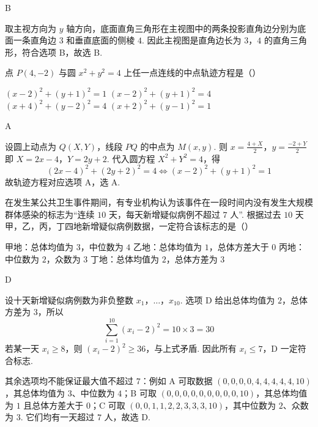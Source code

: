 \begin{answer}
B
\end{answer}

\begin{solution}
取主视方向为 \(y\) 轴方向，底面直角三角形在主视图中的两条投影直角边分别为底面一条直角边 \(3\) 和垂直底面的侧棱 \(4\). 因此主视图是直角边长为 \(3\)，\(4\) 的直角三角形，符合选项 B，故选 B.
\end{solution}

\begin{problem}
点 \(P(4, -2)\) 与圆 \(x^2 + y^2 = 4\) 上任一点连线的中点轨迹方程是（\quad）

\choices
    {\((x - 2)^2 + (y + 1)^2 = 1\)}
    {\((x - 2)^2 + (y + 1)^2 = 4\)}
    {\((x + 4)^2 + (y - 2)^2 = 4\)}
    {\((x + 2)^2 + (y - 1)^2 = 1\)}
\end{problem}

\begin{answer}
A
\end{answer}

\begin{solution}
设圆上动点为 \(Q(X,Y)\)，线段 \(PQ\) 的中点为 \(M(x,y)\). 则
\(x=\frac{4+X}{2}\)，\(y=\frac{-2+Y}{2}\)
即 \(X=2x-4\)，\(Y=2y+2\). 代入圆方程 \(X^2+Y^2=4\)，得
\[
(2x-4)^2+(2y+2)^2=4
\iff (x-2)^2+(y+1)^2=1
\]
故轨迹方程对应选项 A，选 A.
\end{solution}

\begin{problem}
在发生某公共卫生事件期间，有专业机构认为该事件在一段时间内没有发生大规模群体感染的标志为“连续 \(10\) 天，每天新增疑似病例不超过 \(7\) 人”. 根据过去 \(10\) 天甲，乙，丙，丁四地新增疑似病例数据，一定符合该标志的是（\quad）

\choices
    {甲地：总体均值为 \(3\)，中位数为 \(4\)}
    {乙地：总体均值为 \(1\)，总体方差大于 \(0\)}
    {丙地：中位数为 \(2\)，众数为 \(3\)}
    {丁地：总体均值为 \(2\)，总体方差为 \(3\)}
\end{problem}

\begin{answer}
D
\end{answer}

\begin{solution}
设十天新增疑似病例数为非负整数 \(x_1\)，\(\ldots\)，\(x_{10}\). 选项 D 给出总体均值为 \(2\)，总体方差为 \(3\)，所以
\[
\sum_{i=1}^{10}(x_i-2)^2=10\times3=30
\]
若某一天 \(x_i\geqslant8\)，则 \((x_i-2)^2\geqslant36\)，与上式矛盾. 因此所有 \(x_i\leqslant7\)，D 一定符合标志.

其余选项均不能保证最大值不超过 \(7\)：例如 A 可取数据 \((0,0,0,0,4,4,4,4,4,10)\)，其总体均值为 \(3\)、中位数为 \(4\)；B 可取 \((0,0,0,0,0,0,0,0,0,10)\)，其总体均值为 \(1\) 且总体方差大于 \(0\)；C 可取 \((0,0,1,1,2,2,3,3,3,10)\)，其中位数为 \(2\)、众数为 \(3\). 它们均有一天超过 \(7\) 人，故选 D.
\end{solution}

